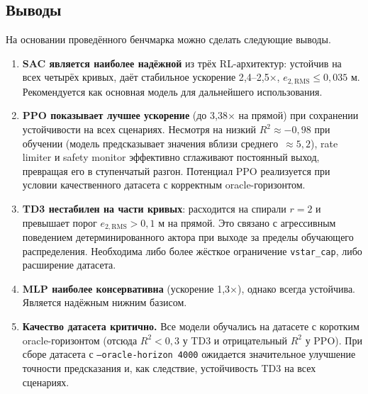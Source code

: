 \FloatBarrier

\subsection{Выводы}

На основании проведённого бенчмарка можно сделать следующие выводы.

\begin{enumerate}
    \item \textbf{SAC является наиболее надёжной} из трёх RL-архитектур: устойчив на всех четырёх кривых, даёт стабильное ускорение 2{,}4--2{,}5×, $e_{2,\mathrm{RMS}} \leq 0{,}035$ м. Рекомендуется как основная модель для дальнейшего использования.

    \item \textbf{PPO показывает лучшее ускорение} (до 3{,}38× на прямой) при сохранении устойчивости на всех сценариях. Несмотря на низкий $R^2 \approx -0{,}98$ при обучении (модель предсказывает значения вблизи среднего~$\approx 5{,}2$), rate limiter и safety monitor эффективно сглаживают постоянный выход, превращая его в ступенчатый разгон. Потенциал PPO реализуется при условии качественного датасета с корректным oracle-горизонтом.

    \item \textbf{TD3 нестабилен на части кривых}: расходится на спирали $r{=}2$ и превышает порог $e_{2,\mathrm{RMS}} > 0{,}1$ м на прямой. Это связано с агрессивным поведением детерминированного актора при выходе за пределы обучающего распределения. Необходима либо более жёсткое ограничение \texttt{vstar\_cap}, либо расширение датасета.

    \item \textbf{MLP наиболее консервативна} (ускорение 1{,}3×), однако всегда устойчива. Является надёжным нижним базисом.

    \item \textbf{Качество датасета критично.} Все модели обучались на датасете с коротким oracle-горизонтом (отсюда $R^2 < 0{,}3$ у TD3 и отрицательный $R^2$ у PPO). При сборе датасета с \texttt{--oracle-horizon 4000} ожидается значительное улучшение точности предсказания и, как следствие, устойчивость TD3 на всех сценариях.
\end{enumerate}
